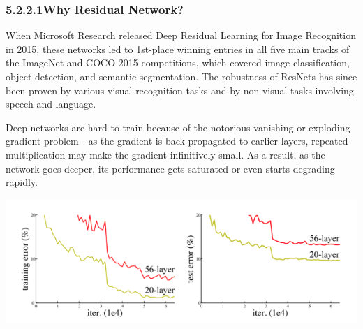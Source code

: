 \subsubsection*{5.2.2.1\hspace{0.5cm}Why Residual Network?}
When Microsoft Research released Deep Residual Learning for Image Recognition in 2015, these networks led to 1st-place winning entries in all five main tracks of the ImageNet and COCO 2015 competitions, which covered image classification, object detection, and semantic segmentation. The robustness of ResNets has since been proven by various visual recognition tasks and by non-visual tasks involving speech and language.\\
\pagebreak
\par
Deep networks are hard to train because of the notorious vanishing or exploding gradient problem - as the gradient is back-propagated to earlier layers, repeated multiplication may make the gradient infinitively small. As a result, as the network goes deeper, its performance gets saturated or even starts degrading rapidly.
\begin{center}
\includegraphics[width=\textwidth]{train-test-error.png}
\end{center}

